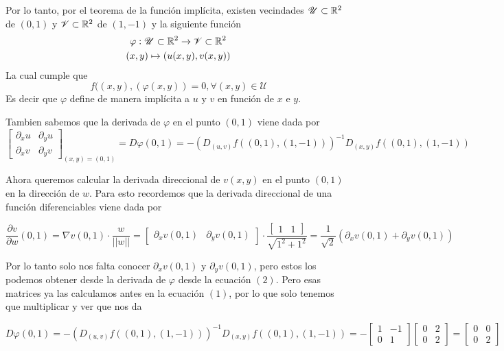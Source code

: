 \documentclass[a4paper,oneside,10.5pt]{article}
\begin{document}
Por lo tanto, por el teorema de la función implícita, existen vecindades $\mathcal{U} \subset \mathbb{R}^2$ de $(0, 1)$ y $\mathcal{V} \subset \mathbb{R}^2$ de $(1, -1)$ y la siguiente función
\begin{gather*}
    \varphi : \mathcal{U} \subset \mathbb{R}^2 \to \mathcal{V} \subset \mathbb{R}^2\\
    (x, y) \mapsto (u(x, y), v(x, y))
\end{gather*}
La cual cumple que
\begin{equation*}
f((x, y), (\varphi(x, y)) = 0, \forall (x, y) \in \mathcal{U}
\end{equation*}
Es decir que $\varphi$ define de manera implícita a $u$ y $v$ en función de $x$ e $y$.

Tambien sabemos que la derivada de $\varphi$ en el punto $(0, 1)$ viene dada por
\begin{equation}
\begin{bmatrix}
    \partial_x u & \partial_y u\\
    \partial_x v & \partial_y v
\end{bmatrix}_{(x, y) = (0, 1)}= D\varphi(0, 1) = -(D_{(u, v)}f((0, 1), (1, -1)))^{-1} D_{(x, y)}f((0, 1), (1, -1))
\end{equation}

Ahora queremos calcular la derivada direccional de $v(x, y)$ en el punto $(0, 1)$ en la dirección de $w$. Para esto recordemos que la derivada direccional de una función diferenciables viene dada por

\begin{equation}
    \frac{\partial v}{\partial w}(0, 1) = \nabla v(0, 1) \cdot \frac{w}{||w||} = \begin{bmatrix} \partial_x v(0, 1) & \partial_y v(0, 1) \end{bmatrix} \cdot \frac{\begin{bmatrix}
        1 & 1
    \end{bmatrix}}{\sqrt{1^2 + 1^2}} = \frac{1}{\sqrt2}(\partial_x v(0, 1) + \partial_y v(0, 1))
\end{equation}

Por lo tanto solo nos falta conocer $\partial_x v(0, 1)$ y $\partial_y v(0, 1)$, pero estos los podemos obtener desde la derivada de $\varphi$ desde la ecuación $(2)$. Pero esas matrices ya las calculamos antes en la ecuación $(1)$, por lo que solo tenemos que multiplicar y ver que nos da

\begin{equation*}
    D\varphi(0, 1) = -(D_{(u, v)}f((0, 1), (1, -1)))^{-1} D_{(x, y)}f((0, 1), (1, -1)) = - \begin{bmatrix}
        1 & -1\\ 0 & 1
    \end{bmatrix}\begin{bmatrix}
        0 & 2\\ 0 & 2
    \end{bmatrix} = \begin{bmatrix}
        0 & 0\\ 0 & 2
    \end{bmatrix}
\end{equation*}
\end{document}
